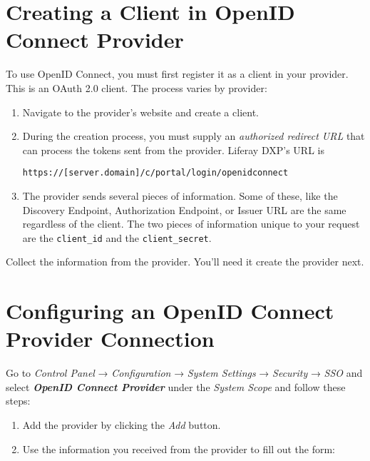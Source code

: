 \section{Creating a Client in OpenID Connect
Provider}\label{creating-a-client-in-openid-connect-provider}

To use OpenID Connect, you must first register it as a client in your
provider. This is an OAuth 2.0 client. The process varies by provider:

\begin{enumerate}
\def\labelenumi{\arabic{enumi}.}
\item
  Navigate to the provider's website and create a client.
\item
  During the creation process, you must supply an \emph{authorized
  redirect URL} that can process the tokens sent from the provider.
  Liferay DXP's URL is

\begin{verbatim}
https://[server.domain]/c/portal/login/openidconnect
\end{verbatim}
\item
  The provider sends several pieces of information. Some of these, like
  the Discovery Endpoint, Authorization Endpoint, or Issuer URL are the
  same regardless of the client. The two pieces of information unique to
  your request are the \texttt{client\_id} and the
  \texttt{client\_secret}.
\end{enumerate}

Collect the information from the provider. You'll need it create the
provider next.

\section{Configuring an OpenID Connect Provider
Connection}\label{configuring-an-openid-connect-provider-connection}

Go to \emph{Control Panel} → \emph{Configuration} → \emph{System
Settings} → \emph{Security} → \emph{SSO} and select \textbf{\emph{OpenID
Connect Provider}} under the \emph{System Scope} and follow these steps:

\begin{enumerate}
\def\labelenumi{\arabic{enumi}.}
\item
  Add the provider by clicking the \emph{Add} button.
\item
  Use the information you received from the provider to fill out the
  form:
\end{enumerate}

